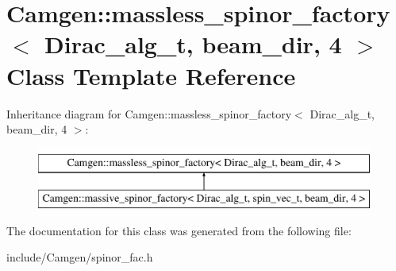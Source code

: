 \hypertarget{a00360}{}\section{Camgen\+:\+:massless\+\_\+spinor\+\_\+factory$<$ Dirac\+\_\+alg\+\_\+t, beam\+\_\+dir, 4 $>$ Class Template Reference}
\label{a00360}
Inheritance diagram for Camgen\+:\+:massless\+\_\+spinor\+\_\+factory$<$ Dirac\+\_\+alg\+\_\+t, beam\+\_\+dir, 4 $>$\+:\begin{figure}[H]
\begin{center}
\leavevmode
\includegraphics[height=2.000000cm]{a00360}
\end{center}
\end{figure}


The documentation for this class was generated from the following file\+:\begin{DoxyCompactItemize}
\item 
include/\+Camgen/spinor\+\_\+fac.\+h\end{DoxyCompactItemize}
